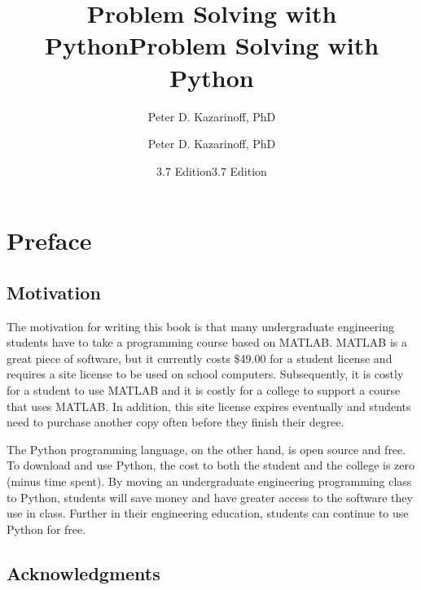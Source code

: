 \documentclass{book}
\title{Problem Solving with Python}
\author{Peter D. Kazarinoff, PhD}
\date{3.7 Edition}
\title{Problem Solving with Python}
\author{Peter D. Kazarinoff, PhD}
\date{3.7 Edition}
\begin{document}
    
    
    
        \maketitle
        
        \newpage
        
        \newpage
        \tableofcontents
    
    


    

    
        \hypertarget{preface}{%
\chapter{Preface}\label{preface}}
    




    
        \hypertarget{motivation}{%
\section{Motivation}\label{motivation}}
    




    
        The motivation for writing this book is that many undergraduate
engineering students have to take a programming course based on MATLAB.
MATLAB is a great piece of software, but it currently costs \$49.00 for
a student license and requires a site license to be used on school
computers. Subsequently, it is costly for a student to use MATLAB and it
is costly for a college to support a course that uses MATLAB. In
addition, this site license expires eventually and students need to
purchase another copy often before they finish their degree.

The Python programming language, on the other hand, is open source and
free. To download and use Python, the cost to both the student and the
college is zero (minus time spent). By moving an undergraduate
engineering programming class to Python, students will save money and
have greater access to the software they use in class. Further in their
engineering education, students can continue to use Python for free.
    




    
        \hypertarget{acknowledgments}{%
\section{Acknowledgments}\label{acknowledgments}}
    
\end{document}
